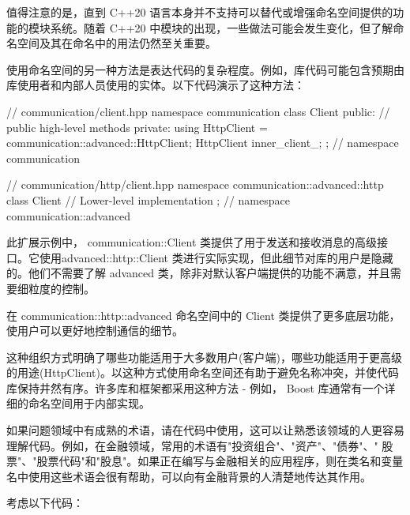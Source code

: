值得注意的是，直到 C++20 语言本身并不支持可以替代或增强命名空间提供的功能的模块系统。随着 C++20 中模块的出现，一些做法可能会发生变化，但了解命名空间及其在命名中的用法仍然至关重要。

使用命名空间的另一种方法是表达代码的复杂程度。例如，库代码可能包含预期由库使用者和内部人员使用的实体。以下代码演示了这种方法：

\begin{cpp}
// communication/client.hpp
namespace communication {
class Client {
public:
    // public high-level methods
private:
    using HttpClient = communication::advanced::HttpClient;
    HttpClient inner_client_;
};
} // namespace communication

// communication/http/client.hpp
namespace communication::advanced::http {
class Client {
    // Lower-level implementation
};
} // namespace communication::advanced
\end{cpp}

此扩展示例中， communication::Client 类提供了用于发送和接收消息的高级接口。它使用advanced::http::Client 类进行实际实现，但此细节对库的用户是隐藏的。他们不需要了解 advanced 类，除非对默认客户端提供的功能不满意，并且需要细粒度的控制。

在 communication::http::advanced 命名空间中的 Client 类提供了更多底层功能，使用户可以更好地控制通信的细节。

这种组织方式明确了哪些功能适用于大多数用户(客户端)，哪些功能适用于更高级的用途(HttpClient)。以这种方式使用命名空间还有助于避免名称冲突，并使代码库保持井然有序。许多库和框架都采用这种方法 - 例如， Boost 库通常有一个详细的命名空间用于内部实现。


如果问题领域中有成熟的术语，请在代码中使用，这可以让熟悉该领域的人更容易理解代码。例如，在金融领域，常用的术语有"投资组合"、"资产"、"债券"、" 股票"、"股票代码"和"股息"。如果正在编写与金融相关的应用程序，则在类名和变量名中使用这些术语会很有帮助，可以向有金融背景的人清楚地传达其作用。

考虑以下代码：

